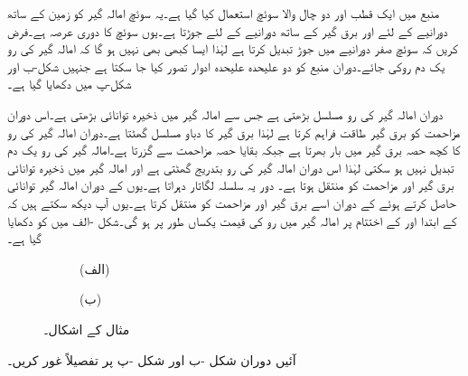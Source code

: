 منبع میں ایک قطب اور دو چال والا سوئچ استعمال کیا گیا ہے۔یہ سوئچ امالہ گیر کو زمین کے ساتھ  دورانیے کے لئے اور برق گیر کے ساتھ  دورانیے کے لئے جوڑتا ہے۔یوں سوئچ کا دوری عرصہ  ہے۔فرض کریں کہ سوئچ صفر دورانیے میں جوڑ تبدیل کرتا ہے لہٰذا ایسا کبھی بھی نہیں ہو گا کہ امالہ گیر کی رو یک دم روکی جائے۔دوران  منبع کو دو علیحدہ علیحدہ ادوار تصور کیا جا سکتا ہے جنہیں شکل-ب اور شکل-پ میں دکھایا گیا ہے۔

دوران  امالہ گیر کی رو مسلسل بڑھتی ہے جس سے امالہ گیر میں ذخیرہ توانائی  بڑھتی ہے۔اس دوران مزاحمت کو برق گیر طاقت فراہم کرتا ہے لہٰذا برق گیر کا دباو مسلسل گھٹتا ہے۔دوران  امالہ گیر کی رو کا کچھ حصہ برق گیر میں بار بھرتا ہے جبکہ بقایا حصہ مزاحمت سے گزرتا ہے۔امالہ گیر کی رو یک دم تبدیل نہیں ہو سکتی لہٰذا اس دوران امالہ گیر کی رو بتدریج گھٹتی ہے اور امالہ گیر میں ذخیرہ توانائی برق گیر اور مزاحمت کو منتقل ہوتا ہے۔ دور یہ سلسلہ لگاتار دہراتا ہے۔یوں  کے دوران امالہ گیر توانائی حاصل کرتے ہوئے  کے دوران اسے برق گیر اور مزاحمت کو منتقل کرتا ہے۔یوں آپ دیکھ سکتے ہیں کہ  کے ابتدا اور  کے اختتام پر امالہ گیر میں رو کی قیمت یکساں طور پر  ہو گی۔شکل -الف میں  کو دکھایا گیا ہے۔
\begin{figure}
\begin{subfigure}{1\textwidth}
\centering
{}
\caption*{(الف)}
\end{subfigure}
%
\begin{subfigure}{1\textwidth}
\centering
{}
\caption*{(ب)}
\end{subfigure}
\caption{مثال  کے اشکال۔}
\label{شکل_عارضی_منبع_چالو_بند_رو}
\end{figure}
آئیں دوران  شکل -ب اور شکل -پ پر تفصیلاً غور کریں۔

